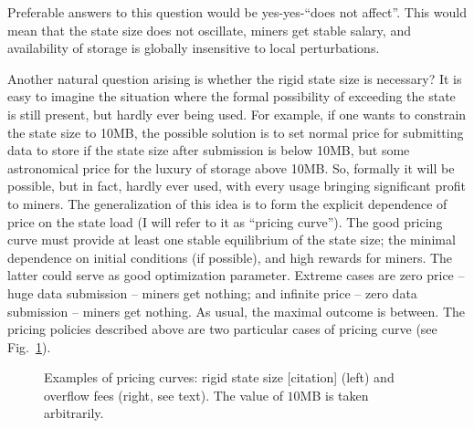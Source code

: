 \documentclass[preprint]{revtex4-1}
\begin{document}
Preferable answers to this question would be yes-yes-``does not affect''. This
would mean that the state size does not oscillate, miners get stable salary, and
availability of storage is globally insensitive to local perturbations.

Another natural question arising is whether the rigid state size is necessary?
It is easy to imagine the situation where the formal possibility of exceeding
the state is still present, but hardly ever being used. For example, if one
wants to constrain the state size to 10MB, the possible solution is to set
normal price for submitting data to store if the state size after submission is
below 10MB, but some astronomical price for the luxury of storage above 10MB.
So, formally it will be possible, but in fact, hardly ever used, with every
usage bringing significant profit to miners. The generalization of this idea is
to form the explicit dependence of price on the state load (I will refer to it
as ``pricing curve''). The good pricing curve must provide at least one stable
equilibrium of the state size; the minimal dependence on initial conditions (if
possible), and high rewards for miners. The latter could serve as good
optimization parameter. Extreme cases are zero price -- huge data submission --
miners get nothing; and infinite price -- zero data submission -- miners get
nothing. As usual, the maximal outcome is between.  The pricing policies
described above are two particular cases of pricing curve (see
Fig.~\ref{fig:steps}).
\begin{figure}
    \hfill
    \hfill
    \hfill
    \caption{
        Examples of pricing curves: rigid state size [citation] (left) and
        overflow fees (right, see text). The value of $10$MB is taken
        arbitrarily.
        \label{fig:steps}
    }
\end{figure}
\end{document}
